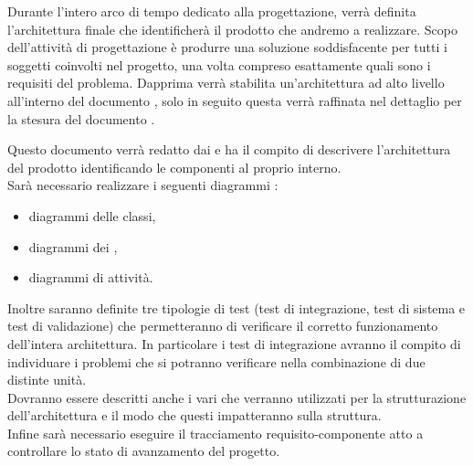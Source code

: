 \documentclass[a4paper, titlepage]{article}
\begin{document}
Durante l'intero arco di tempo dedicato alla progettazione, verrà definita l'architettura finale che identificherà il prodotto che andremo a realizzare.
Scopo dell’attività di progettazione è produrre una soluzione soddisfacente per tutti i soggetti coinvolti nel progetto, una volta compreso esattamente quali sono i requisiti del problema.
\newline Dapprima verrà stabilita un'architettura ad alto livello all'interno del documento , solo in seguito questa verrà raffinata nel dettaglio per la stesura del documento .

Questo documento verrà redatto dai  e ha il compito di descrivere l'architettura del prodotto identificando le componenti al proprio interno. 
\\ Sarà necessario realizzare i seguenti diagrammi :
\begin{itemize}
	\item diagrammi delle classi,
	\item diagrammi dei ,
	\item diagrammi di attività.
\end{itemize}
Inoltre saranno definite tre tipologie di test (test di  integrazione, test di sistema e test di validazione) che permetteranno di verificare il corretto funzionamento dell'intera architettura. In particolare i test di integrazione avranno il compito di individuare i problemi che si potranno verificare nella combinazione di due distinte unità.
\\ Dovranno essere descritti anche i vari  che verranno utilizzati per la strutturazione dell'architettura e il modo che questi impatteranno sulla struttura.
\\ Infine sarà necessario eseguire il tracciamento requisito-componente atto a controllare lo stato di avanzamento del progetto.
\end{document}
